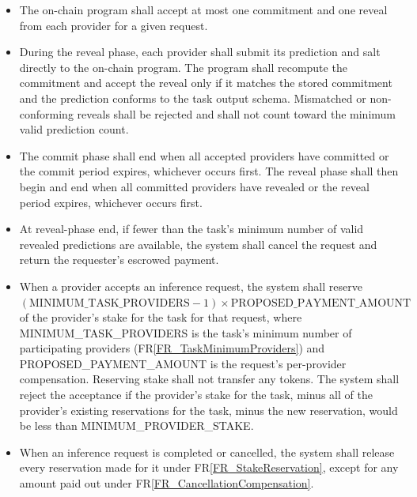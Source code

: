 \documentclass[12pt]{article}
\newcounter{reqnum} %
\newcommand{\rref}[1]{FR\ref{#1}}
\begin{document}
\begin{itemize}
\item[FR\refstepcounter{reqnum}\thereqnum \label{FR_OnePredictionPerProvider}:] The on-chain program shall accept at most one commitment and one reveal from each provider for a given request.

\item[FR\refstepcounter{reqnum}\thereqnum \label{FR_PredictionValidation}:] During the reveal phase, each provider shall submit its prediction and salt directly to the on-chain program. The program shall recompute the commitment and accept the reveal only if it matches the stored commitment and the prediction conforms to the task output schema. Mismatched or non-conforming reveals shall be rejected and shall not count toward the minimum valid prediction count.

\item[FR\refstepcounter{reqnum}\thereqnum \label{FR_PredictionPhaseEnd}:] The commit phase shall end when all accepted providers have committed or the commit period expires, whichever occurs first. The reveal phase shall then begin and end when all committed providers have revealed or the reveal period expires, whichever occurs first.

\item[FR\refstepcounter{reqnum}\thereqnum \label{FR_MinimumPredictions}:] At reveal-phase end, if fewer than the task's minimum number of valid revealed predictions are available, the system shall cancel the request and return the requester's escrowed payment.

\item[FR\refstepcounter{reqnum}\thereqnum \label{FR_StakeReservation}:] When a provider accepts an inference request, the system shall reserve $(\text{MINIMUM\_TASK\_PROVIDERS} - 1) \times \text{PROPOSED\_PAYMENT\_AMOUNT}$ of the provider's stake for the task for that request, where MINIMUM\_TASK\_PROVIDERS is the task's minimum number of participating providers (\rref{FR_TaskMinimumProviders}) and PROPOSED\_PAYMENT\_AMOUNT is the request's per-provider compensation. Reserving stake shall not transfer any tokens. The system shall reject the acceptance if the provider's stake for the task, minus all of the provider's existing reservations for the task, minus the new reservation, would be less than MINIMUM\_PROVIDER\_STAKE.

\item[FR\refstepcounter{reqnum}\thereqnum \label{FR_StakeReservationRelease}:] When an inference request is completed or cancelled, the system shall release every reservation made for it under \rref{FR_StakeReservation}, except for any amount paid out under \rref{FR_CancellationCompensation}.


\end{itemize}
\end{document}
